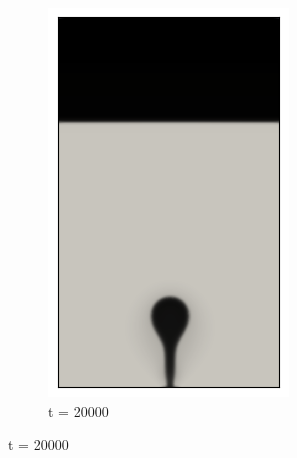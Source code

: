 \begin{figure}[H]
\begin{subfigure}{0.25\textwidth}
		\includegraphics[width=\linewidth]{figs/cap4/cuda_bb_760_s20}
		\caption{t = 20000}
		\label{fig:3}
	\end{subfigure}
	

\end{figure}
